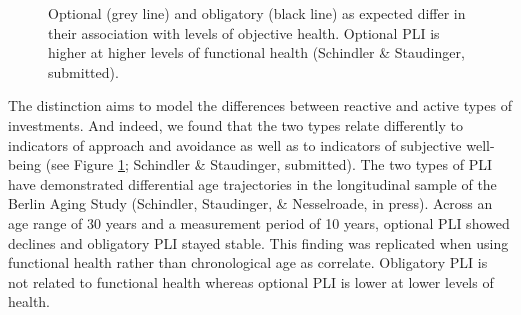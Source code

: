 \begin{figure}[htb]
  \begin{center}
    \caption{Optional (grey line) and obligatory (black line) as expected differ in their association with levels of objective health. Optional PLI is higher at higher levels of functional health (Schindler \& Staudinger, submitted).}
    \label{fig1:profUrsulaStaudinger}
  \end{center}
\end{figure}


The distinction aims to model the differences between reactive and active types of investments. And indeed, we found that the two types relate differently to indicators of approach and avoidance as well as to indicators of subjective well-being (see Figure \ref{fig1:profUrsulaStaudinger}; Schindler \& Staudinger, submitted). The two types of PLI have demonstrated differential age trajectories in the longitudinal sample of the Berlin Aging Study (Schindler, Staudinger, \& Nesselroade, in press). Across an age range of 30 years and a measurement period of 10 years, optional PLI showed declines and obligatory PLI stayed stable. This finding was replicated when using functional health rather than chronological age as correlate. Obligatory PLI is not related to functional health whereas optional PLI is lower at lower levels of health.



